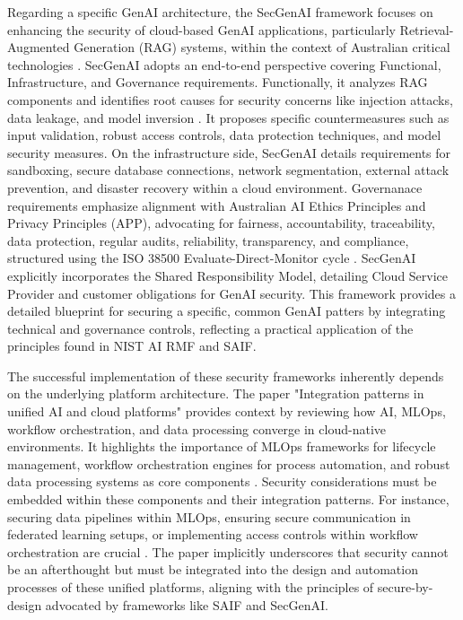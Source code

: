 Regarding a specific GenAI architecture, the SecGenAI framework focuses on enhancing the security of cloud-based GenAI applications, particularly Retrieval-Augmented Generation (RAG) systems, within the context of Australian critical technologies \cite{haryanto_secgenai_2024}. SecGenAI adopts an end-to-end perspective covering Functional, Infrastructure, and Governance requirements. Functionally, it analyzes RAG components and identifies root causes for security concerns like injection attacks, data leakage, and model inversion \cite{haryanto_secgenai_2024}. It proposes specific countermeasures such as input validation, robust access controls, data protection techniques, and model security measures\cite{haryanto_secgenai_2024}. On the infrastructure side, SecGenAI details requirements for sandboxing, secure database connections, network segmentation, external attack prevention, and disaster recovery within a cloud environment\cite{haryanto_secgenai_2024}. Governanace requirements emphasize alignment with Australian AI Ethics Principles and Privacy Principles (APP), advocating for fairness, accountability, traceability, data protection, regular audits, reliability, transparency, and compliance, structured using the ISO 38500 Evaluate-Direct-Monitor cycle \cite{noauthor_isoiec_nodate}. SecGenAI explicitly incorporates the Shared Responsibility Model, detailing Cloud Service Provider and customer obligations for GenAI security\cite{haryanto_secgenai_2024}. This framework provides a detailed blueprint for securing a specific, common GenAI patters by integrating technical and governance controls, reflecting a practical application of the principles found in NIST AI RMF and SAIF.

The successful implementation of these security frameworks inherently depends on the underlying platform architecture. The paper "Integration patterns in unified AI and cloud platforms" provides context by reviewing how AI, MLOps, workflow orchestration, and data processing converge in cloud-native environments\cite{sushil_prabhu_prabhakaran_integration_2024}. It highlights the importance of MLOps frameworks for lifecycle management, workflow orchestration engines for process automation, and robust data processing systems as core components \cite{sushil_prabhu_prabhakaran_integration_2024}. Security considerations must be embedded within these components and their integration patterns. For instance, securing data pipelines within MLOps, ensuring secure communication in federated learning setups, or implementing access controls within workflow orchestration are crucial \cite{sushil_prabhu_prabhakaran_integration_2024, hansen_introducing_2023, haryanto_secgenai_2024}. The paper implicitly underscores that security cannot be an afterthought but must be integrated into the design and automation processes of these unified platforms, aligning with the principles of secure-by-design advocated by frameworks like SAIF and SecGenAI.

